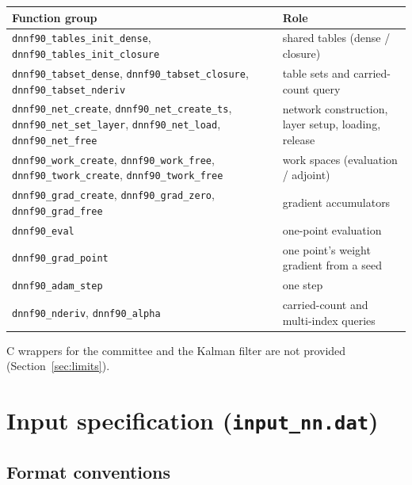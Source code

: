 \documentclass[10pt,a4paper]{article}
\newcommand{\code}[1]{\texttt{#1}}
\begin{document}
\begin{longtable}{@{}p{}p{}@{}}
\toprule
Function group & Role \\
\midrule
\endhead
\code{dnnf90\_tables\_init\_dense}, \code{dnnf90\_tables\_init\_closure} & shared tables (dense / closure)\\
\code{dnnf90\_tabset\_dense}, \code{dnnf90\_tabset\_closure}, \code{dnnf90\_tabset\_nderiv} & table sets and carried-count query\\
\code{dnnf90\_net\_create}, \code{dnnf90\_net\_create\_ts}, \code{dnnf90\_net\_set\_layer}, \code{dnnf90\_net\_load}, \code{dnnf90\_net\_free} & network construction, layer setup, loading, release\\
\code{dnnf90\_work\_create}, \code{dnnf90\_work\_free}, \code{dnnf90\_twork\_create}, \code{dnnf90\_twork\_free} & work spaces (evaluation / adjoint)\\
\code{dnnf90\_grad\_create}, \code{dnnf90\_grad\_zero}, \code{dnnf90\_grad\_free} & gradient accumulators\\
\code{dnnf90\_eval} & one-point evaluation\\
\code{dnnf90\_grad\_point} & one point's weight gradient from a seed\\
\code{dnnf90\_adam\_step} & one step\\
\code{dnnf90\_nderiv}, \code{dnnf90\_alpha} & carried-count and multi-index queries\\
\bottomrule
\end{longtable}

C wrappers for the committee and the Kalman filter are not provided
(Section~\ref{sec:limits}).

\section{Input specification (\code{input\_nn.dat})}

\subsection{Format conventions}
\end{document}
